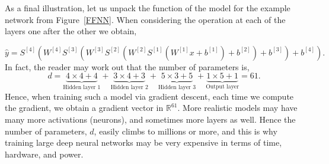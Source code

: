 As a final illustration, let us unpack the function of the model for the example network from Figure~\ref{FFNN}. When considering the operation at each of the layers one after the other we obtain,

\begin{equation}
\label{eqn:opened-out-example-2}
\hat{y} =S^{[4]}(W^{[4]}S^{[3]}(W^{[3]}S^{[2]}(W^{[2]}S^{[1]}(W^{[1]}x+b^{[1]})+b^{[2]}) +b^{[3]})+b^{[4]}).
\end{equation}
In fact, the reader may work out that the number of parameters is,
%
\begin{equation}
\label{eq:61-is-the-number}
d = \underbrace{4\times4 + 4}_{\text{Hidden layer 1}} + \underbrace{3\times 4 + 3}_{\text{Hidden layer 2}}+ \underbrace{5\times 3 + 5}_{\text{Hidden layer 3}}  + \underbrace{1 \times 5 +1}_{\text{Output layer}}  = 61.
\end{equation}
%
Hence, when training such a model via gradient descent, each time we compute the gradient, we obtain a gradient vector in ${\mathbb R}^{61}$. More realistic models may have many more activations (neurons), and sometimes more layers as well. Hence the number of parameters, $d$, easily climbs to millions or more, and this is why training large deep neural networks may be very expensive in terms of time, hardware, and power.

